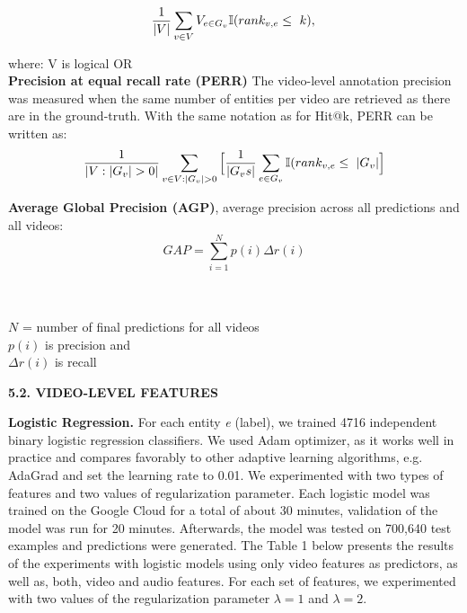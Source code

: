 \documentclass{sig-alternate-05-2015}
\begin{document}
\begin{equation}
\frac{1}{|V|}\sum_{v\in V}V_{e \in G_{v}} \mathbb{I}(rank_{v,e} \leq\ k), \\
\end{equation}

\vspace{0.5em}
\noindent
where: V is logical OR \\


\noindent 
\textbf{Precision at equal recall rate (PERR)} The video-level annotation precision was measured when the same number of entities per video are retrieved as there are in the ground-truth. With the same notation as for Hit@k, PERR can be written as: \\

\begin{equation}
\small \frac{1}{|V : |G_{v}| > 0 |} \sum_{v \in V :|G_{v}| > 0} \Big[ \frac{1}{|G_{v}s|} \sum_{e \in G_{v}} \mathbb{I}(rank_{v,e} \leq\ |G_{v}|  \Big] \small
\end{equation}

\vspace{1em}
\noindent 
\textbf{Average Global Precision (AGP)}, average precision across all predictions and all videos: \\
\begin{equation}
GAP = \sum_{i=1}^{N}p(i)\Delta r(i)
\end{equation}

\noindent
{} \\ \\
$N$ = number of final predictions for all videos \\
$p(i)$ is precision and  \\
$\Delta$$r(i) $ is recall



\vspace{2em}
\noindent 
\textbf{5.2. VIDEO-LEVEL FEATURES} 

\vspace{1em}
\noindent
\textbf{Logistic Regression.}
For each entity \textit{e} (label), we trained 4716 independent binary logistic regression classifiers. We used Adam optimizer, as it works well in practice and compares favorably to other adaptive learning algorithms, e.g. AdaGrad and set the learning rate to 0.01. We experimented with two types of features and two values of regularization parameter. Each logistic model was trained on the Google Cloud for a total of about 30 minutes, validation of the model was run for 20 minutes. Afterwards, the model was tested  on 700,640 test examples and predictions were generated. The Table 1 below presents the results of the experiments with logistic models using only video features as predictors, as well as, both, video and audio features. For each set of features, we experimented with two values of the regularization parameter $\lambda = 1$ and $\lambda = 2$.  
	
\end{document}
